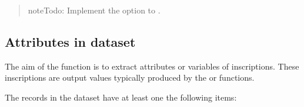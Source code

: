 \documentclass[a4paper,12pt,english]{sphinxhowto}
\begin{document}
\begin{quote}

\begin{sphinxadmonition}{note}{\label{\detokenize{EDHVariables:id1}}Todo:}
Implement the   option to .
\end{sphinxadmonition}
\end{quote}



\subsection{Attributes in  dataset}
\label{\detokenize{EDHVariables:attributes-in-edh-dataset}}\label{\detokenize{EDHVariables:edh-attr}}
The aim of the  function is to extract attributes or variables of inscriptions. These inscriptions are output values
typically produced by the  or  functions.

The records in the  dataset have at least one the following items:
\end{document}
